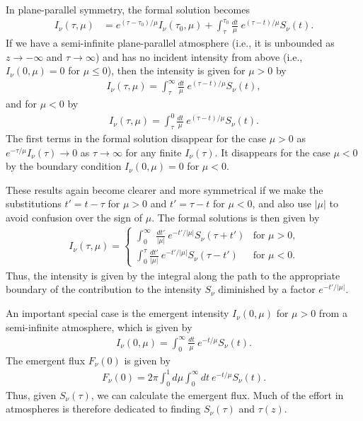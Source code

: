 In plane-parallel symmetry, the formal solution becomes
\begin{align}
I_\nu(\tau,\mu) &=
e^{(\tau-\tau_0)/\mu}I_\nu(\tau_0,\mu) + 
\int_{\tau}^{\tau_0}\!\frac{dt}{\mu}\:e^{(\tau-t)/\mu}S_\nu(t).
\end{align}
If we have a semi-infinite plane-parallel atmosphere (i.e.,
it is unbounded as $z \rightarrow -\infty$ and $\tau
\rightarrow \infty$) and has no incident intensity from
above (i.e., $I_\nu(0,\mu) = 0$ for $\mu \le 0$), then the
intensity is given for $\mu > 0$ by
\begin{align}
I_\nu(\tau,\mu) = 
\int_{\tau}^\infty\!\frac{dt}{\mu}\: e^{(\tau -
t)/\mu} S_\nu(t),
\end{align}
and for $\mu < 0$ by
\begin{align}
I_\nu(\tau,\mu) = 
\int_{\tau}^0\!\frac{dt}{\mu}\: e^{(\tau -
t)/\mu} S_\nu(t).
\end{align}
The first terms in the formal solution disappear for the
case $\mu > 0$ as $e^{-\tau/\mu}I_\nu(\tau)
\rightarrow 0$ as $\tau \rightarrow \infty$ for any
finite $I_\nu(\tau)$. It disappears for the case $\mu
< 0$ by the boundary condition $I_\nu(0,\mu) = 0$ for $\mu
< 0$.

These results again become clearer and more symmetrical if
we make the substitutions $t' = t-\tau$ for $\mu
> 0$ and $t' =
\tau-t$ for $\mu < 0$, and also use $|\mu|$ to avoid confusion over
the sign of $\mu$. The formal solutions is 
then given by
\begin{align}
I_\nu(\tau,\mu) =
\begin{cases}
\int_0^\infty\,\,\frac{dt'}{|\mu|}\: e^{-t'/|\mu|}
S_\nu(\tau+t')
&\mbox{for $\mu > 0$,}\\
\int_0^{\tau}\!\frac{dt'}{|\mu|}\: e^{-t'/|\mu|}
S_\nu(\tau-t')
&\mbox{for $\mu < 0$.}
\end{cases}
\end{align}
Thus, the intensity is given by the integral along the path
to the appropriate boundary of the contribution to the
intensity $S_\nu$ diminished by a factor $e^{-t'/|\mu|}$.

An important special case is the emergent intensity
$I_\nu(0,\mu)$ for $\mu > 0$ from a semi-infinite
atmosphere, which is given by
\begin{align}
I_\nu(0,\mu) = \int_0^\infty\!\frac{dt}{\mu}\:e^{-
t/\mu} S_\nu(t).
\end{align}
The emergent flux $F_\nu(0)$ is given by
\begin{align}
F_\nu(0) = 2\pi \int_0^1\!\!\!d\mu\int_0^\infty\!\!\!dt\:e^{-
t/\mu} S_\nu(t).
\end{align}
Thus, given $S_\nu(\tau)$, we can calculate the emergent flux. Much of the effort in atmospheres is therefore dedicated to finding $S_\nu(\tau)$ and $\tau(z)$.

